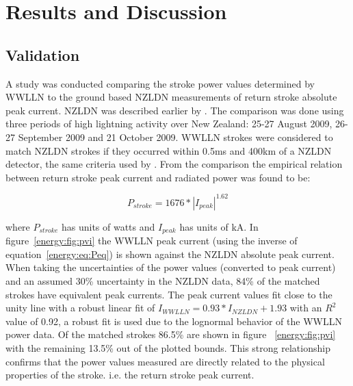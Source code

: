 \section{Results and Discussion}

\subsection{Validation}

A study was conducted comparing the stroke power values determined by WWLLN to the ground based NZLDN measurements of return stroke absolute peak current. NZLDN was described earlier by \citet{Rodger2006}.
The comparison was done using three periods of high lightning activity over New Zealand: 25-27 August 2009, 26-27 September 2009 and 21 October 2009.
WWLLN strokes were considered to match NZLDN strokes if they occurred within 0.5ms and 400km of a NZLDN detector, the same criteria used by \citet{Rodger2006}.
From the comparison the empirical relation between return stroke peak current and radiated power was found to be: 

\begin{equation}
P_{stroke} = 1676 * |I_{peak}|^{1.62}
\label{energy:eq:Peq}
\end{equation}

where $P_{stroke}$ has units of watts and $I_{peak}$ has units of kA.
In figure~\ref{energy:fig:pvi} the WWLLN peak current (using the inverse of equation~\ref{energy:eq:Peq}) is shown against the NZLDN absolute peak current.
When taking the uncertainties of the power values (converted to peak current) and an assumed 30\% uncertainty in the NZLDN data, 84\% of the matched strokes have equivalent peak currents.
The peak current values fit close to the unity line with a robust linear fit of $I_{WWLLN}=0.93*I_{NZLDN}+1.93$ with an $R^2$ value of 0.92, a robust fit is used due to the lognormal behavior of the WWLLN power data.
Of the matched strokes 86.5\% are shown in figure~ \ref{energy:fig:pvi} with the remaining 13.5\% out of the plotted bounds.
This strong relationship confirms that the power values measured are directly related to the physical properties of the stroke. i.e. the return stroke peak current.


